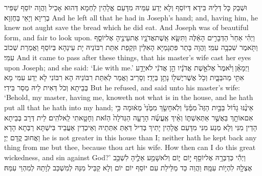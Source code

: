 {וּשְׁבַק כָּל דְּלֵיהּ בִּידָא דְּיוֹסֵף וְלָא יְדַע עִמֵּיהּ מִדָּעַם אֱלָהֵין לַחְמָא דְּהוּא אָכֵיל וַהֲוָה יוֹסֵף שַׁפִּיר בְרֵיוָא וְיָאֵי בְּחֶזְוָא׃}
{And he left all that he had in Joseph’s hand; and, having him, he knew not aught save the bread which he did eat. And Joseph was of beautiful form, and fair to look upon.}{}
{וַיְהִ֗י אַחַר֙ הַדְּבָרִ֣ים הָאֵ֔לֶּה וַתִּשָּׂ֧א אֵֽשֶׁת\maqqaf אֲדֹנָ֛יו אֶת\maqqaf עֵינֶ֖יהָ אֶל\maqqaf יוֹסֵ֑ף וַתֹּ֖אמֶר שִׁכְבָ֥ה עִמִּֽי׃}
{וַהֲוָה בָּתַר פִּתְגָמַיָּא הָאִלֵּין וּזְקַפַת אִתַּת רִבּוֹנֵיהּ יָת עֵינַהָא בְּיוֹסֵף וַאֲמַרַת שְׁכוֹב עִמִּי׃}
{And it came to pass after these things, that his master’s wife cast her eyes upon Joseph; and she said: ‘Lie with me.’}{}
{וַיְמָאֵ֓ן \legarmeh  וַיֹּ֙אמֶר֙ אֶל\maqqaf אֵ֣שֶׁת אֲדֹנָ֔יו הֵ֣ן אֲדֹנִ֔י לֹא\maqqaf יָדַ֥ע אִתִּ֖י מַה\maqqaf בַּבָּ֑יִת וְכֹ֥ל אֲשֶׁר\maqqaf יֶשׁ\maqqaf ל֖וֹ נָתַ֥ן בְּיָדִֽי׃}
{וְסָרֵיב וַאֲמַר לְאִתַּת רִבּוֹנֵיהּ הָא רִבּוֹנִי לָא יְדַע עִמִּי מָא בְּבֵיתָא וְכֹל דְּאִית לֵיהּ מְסַר בִּידִי׃}
{But he refused, and said unto his master’s wife: ‘Behold, my master, having me, knoweth not what is in the house, and he hath put all that he hath into my hand;}{}
{אֵינֶ֨נּוּ גָד֜וֹל בַּבַּ֣יִת הַזֶּה֮ מִמֶּ֒נִּי֒ וְלֹֽא\maqqaf חָשַׂ֤ךְ מִמֶּ֙נִּי֙ מְא֔וּמָה כִּ֥י אִם\maqqaf אוֹתָ֖ךְ בַּאֲשֶׁ֣ר אַתְּ\maqqaf אִשְׁתּ֑וֹ וְאֵ֨יךְ אֶֽעֱשֶׂ֜ה הָרָעָ֤ה הַגְּדֹלָה֙ הַזֹּ֔את וְחָטָ֖אתִי לֵֽאלֹהִֽים׃}
{לֵית דְּרָב בְּבֵיתָא הָדֵין מִנִּי וְלָא מְנַע מִנִּי מִדָּעַם אֱלָהֵין יָתִיךְ בְּדִיל דְּאַתְּ אִתְּתֵיהּ וְאֵיכְדֵין אַעֲבֵיד בִּישְׁתָּא רַבְּתָא הָדָא וַאֲחוּב קֳדָם יְיָ׃}
{he is not greater in this house than I; neither hath he kept back any thing from me but thee, because thou art his wife. How then can I do this great wickedness, and sin against God?’}{}
{וַיְהִ֕י כְּדַבְּרָ֥הּ אֶל\maqqaf יוֹסֵ֖ף י֣וֹם \pasek  י֑וֹם וְלֹא\maqqaf שָׁמַ֥ע אֵלֶ֛יהָ לִשְׁכַּ֥ב אֶצְלָ֖הּ לִהְי֥וֹת עִמָּֽהּ׃}
{וַהֲוַה כַּד מַלֵּילַת עִם יוֹסֵף יוֹם יוֹם וְלָא קַבֵּיל מִנַּהּ לְמִשְׁכַּב לְוָתַהּ לְמִהְוֵי עִמַּהּ׃}
